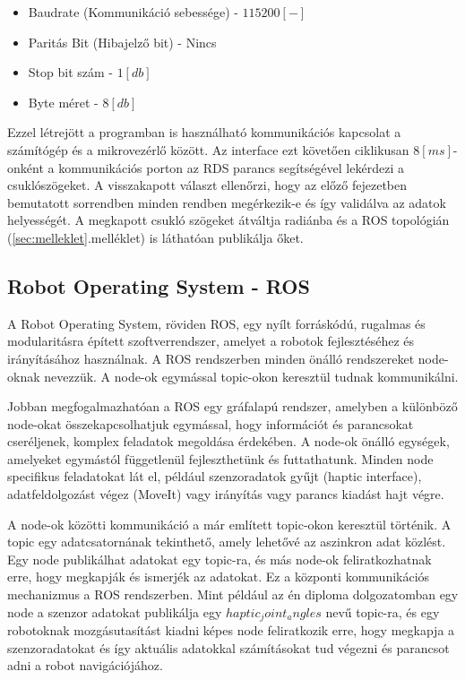 \begin{itemize}
\item Baudrate (Kommunikáció sebessége) - $115200 [-]$
\item Paritás Bit (Hibajelző bit) - Nincs
\item Stop bit szám - $1 [db]$
\item Byte méret - $8[db]$
\end{itemize}

Ezzel létrejött a programban is használható kommunikációs kapcsolat a számítógép és a mikrovezérlő között. Az interface ezt követően ciklikusan $8[ms]$-onként a kommunikációs porton az RDS parancs segítségével lekérdezi a csuklószögeket. A visszakapott választ ellenőrzi, hogy az előző fejezetben bemutatott sorrendben minden rendben megérkezik-e és így validálva az adatok helyességét. A megkapott csukló szögeket átváltja radiánba és a ROS topológián (\ref{sec:melleklet}.melléklet) is láthatóan publikálja őket.\cite{MogiHapticDevice}

\subsection{Robot Operating System - ROS}
A Robot Operating System, röviden ROS, egy nyílt forráskódú, rugalmas és modularitásra épített szoftverrendszer, amelyet a robotok fejlesztéséhez és irányításához használnak. A ROS rendszerben minden önálló rendszereket node-oknak nevezzük. A node-ok egymással topic-okon keresztül tudnak kommunikálni.

Jobban megfogalmazhatóan a ROS egy gráfalapú rendszer, amelyben a különböző node-okat összekapcsolhatjuk egymással, hogy információt és parancsokat cseréljenek, komplex feladatok megoldása érdekében. A node-ok önálló egységek, amelyeket egymástól függetlenül fejleszthetünk és futtathatunk. Minden node specifikus feladatokat lát el, például szenzoradatok gyűjt (haptic interface), adatfeldolgozást végez (MoveIt) vagy irányítás vagy parancs kiadást hajt végre.

A node-ok közötti kommunikáció a már említett topic-okon keresztül történik. A topic egy adatcsatornának tekinthető, amely lehetővé az aszinkron adat közlést. Egy node publikálhat adatokat egy topic-ra, és más node-ok feliratkozhatnak erre, hogy megkapják és ismerjék az adatokat. Ez a központi kommunikációs mechanizmus a ROS rendszerben. Mint például az én diploma dolgozatomban egy node a szenzor adatokat publikálja egy $haptic_joint_angles$ nevű topic-ra, és egy robotoknak mozgásutasítást kiadni képes node feliratkozik erre, hogy megkapja a szenzoradatokat és így aktuális adatokkal számításokat tud végezni és parancsot adni a robot navigációjához.

